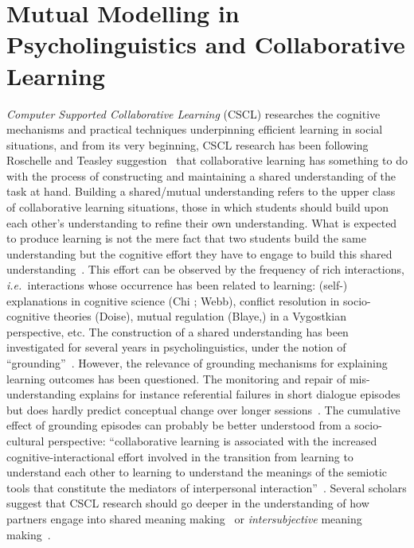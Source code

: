 \documentclass{sig-alternate}
\newcommand{\ie}{{\textit{i.e.~}}}
\begin{document}
\section{Mutual Modelling in Psycholinguistics and Collaborative Learning}

\emph{Computer Supported Collaborative Learning} (CSCL) researches the cognitive
mechanisms and practical techniques underpinning efficient learning in social
situations, and from its very beginning, CSCL research has been following
Roschelle and Teasley suggestion~\cite{roschelle1995construction} that
collaborative learning has something to do with the process of constructing and
maintaining a shared understanding of the task at hand. Building a shared/mutual
understanding refers to the upper class of collaborative learning situations,
those in which students should build upon each other's understanding to refine
their own understanding.  What is expected to produce learning is not the mere
fact that two students build the same understanding but the cognitive effort
they have to engage to build this shared
understanding~\cite{schwartz1995emergence}. This effort can be observed by the
frequency of rich interactions, \ie interactions whose occurrence has been
related to learning: (self-) explanations in cognitive science (Chi ; Webb),
conflict resolution in socio-cognitive theories (Doise), mutual regulation
(Blaye,) in a Vygostkian perspective, etc. The construction of a shared
understanding has been investigated for several years in psycholinguistics,
under the  notion of ``grounding''~\cite{clark1986referring}.  However, the
relevance of grounding mechanisms for explaining learning outcomes has been
questioned. The monitoring and repair of mis-understanding explains for instance
referential failures in short dialogue episodes but does hardly predict
conceptual change over longer sessions~\cite{dillenbourg2006sharing}. The
cumulative effect of grounding episodes can probably be better understood from a
socio-cultural perspective: ``collaborative learning is associated with the
increased cognitive-interactional effort involved in the transition from
learning to understand each other to learning to understand the meanings of the
semiotic tools that constitute the mediators of interpersonal
interaction''~\cite{baker1999role}.  Several scholars suggest that CSCL research
should go deeper in the understanding of how partners engage into shared meaning
making~\cite{stahl2007meaning} or \emph{intersubjective} meaning
making~\cite{suthers2006technology}.
\end{document}
